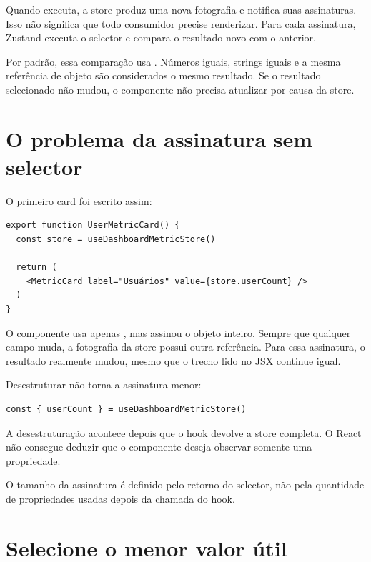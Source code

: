 Quando  executa, a store produz uma nova fotografia e
notifica suas assinaturas. Isso não significa que todo consumidor precise
renderizar. Para cada assinatura, Zustand executa o selector e compara o
resultado novo com o anterior.

Por padrão, essa comparação usa . Números iguais, strings
iguais e a mesma referência de objeto são considerados o mesmo resultado. Se o
resultado selecionado não mudou, o componente não precisa atualizar por causa
da store.

\section{O problema da assinatura sem selector}

O primeiro card foi escrito assim:

\begin{lstlisting}[caption={O card assina a fotografia completa da store.}]
export function UserMetricCard() {
  const store = useDashboardMetricStore()

  return (
    <MetricCard label="Usuários" value={store.userCount} />
  )
}
\end{lstlisting}

O componente usa apenas , mas assinou o objeto inteiro. Sempre
que qualquer campo muda, a fotografia da store possui outra referência. Para
essa assinatura, o resultado realmente mudou, mesmo que o trecho lido no JSX
continue igual.

Desestruturar não torna a assinatura menor:

\begin{lstlisting}
const { userCount } = useDashboardMetricStore()
\end{lstlisting}

A desestruturação acontece depois que o hook devolve a store completa. O React
não consegue deduzir que o componente deseja observar somente uma propriedade.

\begin{decisao}
O tamanho da assinatura é definido pelo retorno do selector, não pela quantidade
de propriedades usadas depois da chamada do hook.
\end{decisao}

\section{Selecione o menor valor útil}

